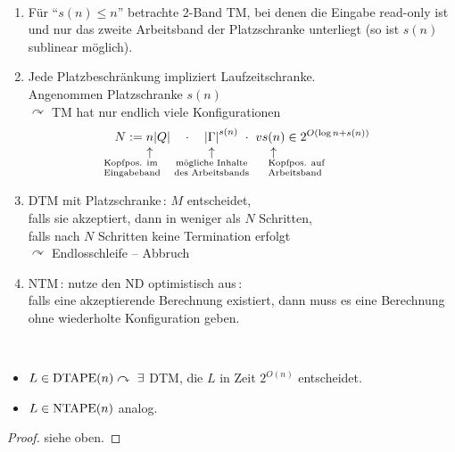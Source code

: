 \begin{Bemerkung}\
	\newcommand{\underarrowset}[2]{%
		\underset{%
			\mathclap{%
				\overset{\displaystyle\uparrow}{\mathclap{#1}}%
			}%
		}{#2}%
	}
	\begin{enumerate}
	\item Für "`$s(n)\leq n$"' betrachte 2-Band \ac{TM}, bei denen die Eingabe read-only ist und nur das zweite Arbeitsband der Platzschranke unterliegt (so ist $s(n)$ sublinear möglich).
	\item Jede Platzbeschränkung impliziert Laufzeitschranke.\\
	Angenommen Platzschranke $s(n)$\\
	$\curvearrowright$ \ac{TM} hat nur endlich viele Konfigurationen
	\[ N := \underarrowset{%
			\parbox{\widthof{\scriptsize Eingabeband}}{\raggedright\scriptsize Kopfpos. im Eingabeband}\hspace{1cm}
		}{n\vphantom{|}}
		|Q| \quad\cdot\quad
		\underarrowset{\parbox{2.2cm}{\scriptsize\centering mögliche Inhalte des Arbeitsbands}}{|\Gamma|}^{s(n)}
		\ \cdot\
v		\underarrowset{\hspace{1.7cm}\parbox{2cm}{\scriptsize Kopfpos. auf\\ Arbeitsband}}{s(n)}
		\in 2^{O(\log n + s(n))}
	\]
	\item \ac{DTM} mit Platzschranke\,: $M$ entscheidet,\\
	falls sie akzeptiert, dann in weniger als $N$ Schritten,\\
	falls nach $N$ Schritten keine Termination erfolgt\\
	\quad$\curvearrowright$ Endlosschleife -- Abbruch
	\item \ac{NTM}\,: nutze den \ac{ND} optimistisch aus\,:\\
	falls eine akzeptierende Berechnung existiert, dann muss es eine Berechnung ohne wiederholte Konfiguration geben.
	\end{enumerate}
\end{Bemerkung}
\begin{Satz}[name={[$L\in\DTAPE(n),\ L\in\NTAPE(n)$]}]\label{satz:6.2}\
	\begin{itemize}
	\item $L\in\operatorname{DTAPE}(n) \curvearrowright\ \exists$ \ac{DTM}, die $L$ in Zeit $2^{O(n)}$ entscheidet.
	\item $L\in\operatorname{NTAPE}(n)$ analog.
	\end{itemize}
\end{Satz}\vspace{-2em}
\begin{proof}
	siehe oben.
\end{proof}
